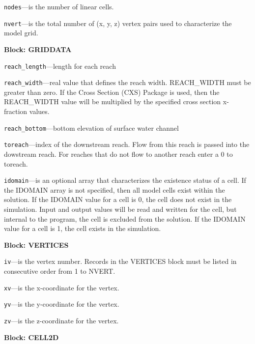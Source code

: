 \begin{description}
\item \texttt{nodes}---is the number of linear cells.

\item \texttt{nvert}---is the total number of (x, y, z) vertex pairs used to characterize the model grid.

\end{description}
\item \textbf{Block: GRIDDATA}

\begin{description}
\item \texttt{reach\_length}---length for each reach

\item \texttt{reach\_width}---real value that defines the reach width. REACH\_WIDTH must be greater than zero.  If the Cross Section (CXS) Package is used, then the REACH\_WIDTH value will be multiplied by the specified cross section x-fraction values.

\item \texttt{reach\_bottom}---bottom elevation of surface water channel

\item \texttt{toreach}---index of the downstream reach.  Flow from this reach is passed into the dowstream reach.  For reaches that do not flow to another reach enter a 0 to toreach.

\item \texttt{idomain}---is an optional array that characterizes the existence status of a cell.  If the IDOMAIN array is not specified, then all model cells exist within the solution.  If the IDOMAIN value for a cell is 0, the cell does not exist in the simulation.  Input and output values will be read and written for the cell, but internal to the program, the cell is excluded from the solution.  If the IDOMAIN value for a cell is 1, the cell exists in the simulation.

\end{description}
\item \textbf{Block: VERTICES}

\begin{description}
\item \texttt{iv}---is the vertex number.  Records in the VERTICES block must be listed in consecutive order from 1 to NVERT.

\item \texttt{xv}---is the x-coordinate for the vertex.

\item \texttt{yv}---is the y-coordinate for the vertex.

\item \texttt{zv}---is the z-coordinate for the vertex.

\end{description}
\item \textbf{Block: CELL2D}

